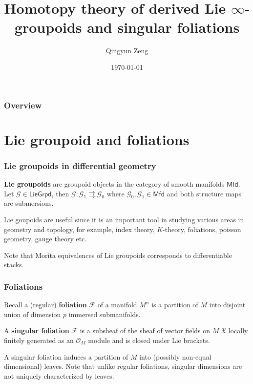 \documentclass{beamer}
\title[Derived Lie $\infty$-groupoids]{Homotopy theory of derived Lie $\infty$-groupoids and singular foliations} %
\author{Qingyun Zeng} %
\institute[Penn] %
{
University of Pennsylvania \\ %
\medskip
\textit{qze@math.upenn.com} %
}
\date{\today} %
\theoremstyle{definition}
\theoremstyle{remark}
\numberwithin{equation}{section}
\newcommand{\CF}{{\mathcal F}}
\newcommand{\mfd}{\mathsf{Mfd}}
\newcommand{\lgpd}{\mathsf{LieGrpd}}
\begin{document}
\begin{frame}
\titlepage %
\end{frame}

\begin{frame}
\frametitle{Overview} %
\tableofcontents %
\end{frame}


\section{Lie groupoid and foliations} %
\begin{frame}
	\frametitle{Lie groupoids in differential geometry}
	{\bf Lie groupoids} are groupoid objects in the category of smooth manifolds $\mfd$. Let $\mathcal{G}\in \lgpd$, then $\mathcal{G}: \mathcal{G}_1\rightrightarrows \mathcal{G}_0$ where $\mathcal{G}_0,\mathcal{G}_1\in \mfd$ and both structure maps are submersions.
	
	
		Lie goupoids are useful since it is an important tool in studying various areas in geometry and topology, for example, index theory, $K$-theory, foliations, poisson geometry, gauge theory etc.
	
	Note that Morita equivalences of Lie groupoids corresponds to differentiable stacks.
\end{frame}

\begin{frame}
	\frametitle{Foliations}
	Recall a (regular) {\bf foliation} $\CF$ of a manifold $M^n$ is a partition of $M$ into disjoint union of dimension $p$ immersed submanifolds.
	\begin{definition}[Stefan]
	A {\bf singular foliation} $\CF$ is a subsheaf of the sheaf of vector fields on $M$ $\mathfrak{X}$ locally finitely generated as an $\mathcal{O}_M$ module and is closed under Lie brackets.  
	\end{definition}
A singular foliation induces a partition of $M$ into (possibly non-equal dimensional) leaves. Note that unlike regular foliations, singular dimensions are not uniquely characterized by leaves.
\end{frame}
\end{document}
